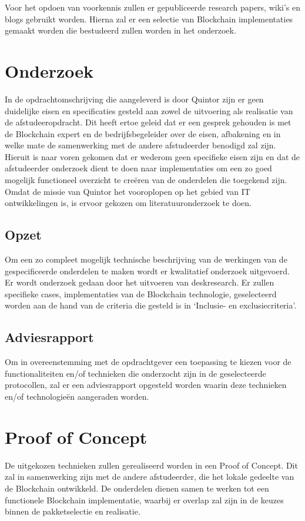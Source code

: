 Voor het opdoen van voorkennis zullen er gepubliceerde research papers, wiki’s en blogs gebruikt worden. Hierna zal er een selectie van Blockchain implementaties gemaakt worden die bestudeerd zullen worden in het onderzoek.

\newpage
\section{Onderzoek} In de opdrachtomschrijving die aangeleverd is door Quintor zijn er geen duidelijke eisen en specificaties gesteld aan zowel de uitvoering als realisatie van de afstudeeropdracht. Dit heeft ertoe geleid dat er een gesprek gehouden is met de Blockchain expert en de bedrijfsbegeleider over de eisen, afbakening en in welke mate de samenwerking met de andere afstudeerder benodigd zal zijn. Hieruit is naar voren gekomen dat er wederom geen specifieke eisen zijn en dat de afstudeerder onderzoek dient te doen naar implementaties om een zo goed mogelijk functioneel overzicht te creëren van de onderdelen die toegekend zijn. Omdat de missie van Quintor het vooroplopen op het gebied van IT ontwikkelingen is, is ervoor gekozen om literatuuronderzoek te doen.

\subsection{Opzet}

Om een zo compleet mogelijk technische beschrijving van de werkingen van de gespecificeerde onderdelen te maken wordt er kwalitatief onderzoek uitgevoerd. Er wordt onderzoek gedaan door het uitvoeren van deskresearch. Er zullen specifieke cases, implementaties van de Blockchain technologie, geselecteerd worden aan de hand van de criteria die gesteld is in ‘Inclusie- en exclusiecriteria’. 

\subsection{Adviesrapport}

Om in overeenstemming met de opdrachtgever een toepassing te kiezen voor de functionaliteiten en/of technieken die onderzocht zijn in de geselecteerde protocollen, zal er een adviesrapport opgesteld worden waarin deze technieken en/of technologieën aangeraden worden. 

\newpage
\section{Proof of Concept}
De uitgekozen technieken zullen gerealiseerd worden in een Proof of Concept. Dit zal in samenwerking zijn met de andere afstudeerder, die het lokale gedeelte van de Blockchain ontwikkeld. De onderdelen dienen samen te werken tot een functionele Blockchain implementatie, waarbij er overlap zal zijn in de keuzes binnen de pakketselectie en realisatie.


